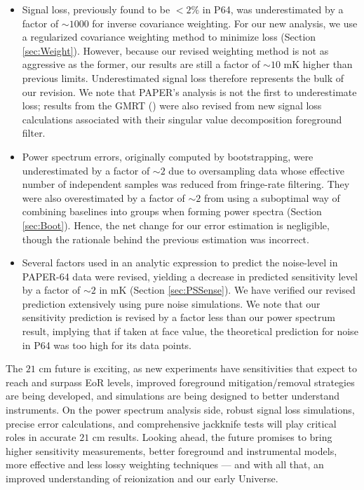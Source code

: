 \documentclass[preprint2,numberedappendix,tighten]{aastex6}  %
\begin{document}
\begin{itemize}
\item Signal loss, previously found to be $<2\%$ in P64, was underestimated by a factor of $\sim$$1000$ for inverse 
covariance weighting. For our new analysis, we use a regularized covariance weighting method to minimize loss (Section 
\ref{sec:Weight}). However, because our revised weighting method is not as aggressive as the former, our results are still a 
factor of $\sim10$ mK higher than previous limits. Underestimated signal loss therefore represents the bulk of our revision. We 
note that PAPER's analysis is not the first to underestimate loss; results from the GMRT (\citealt{paciga_et_al2013}) were also 
revised from new signal loss calculations associated with their singular value decomposition foreground filter.
\item Power spectrum errors, originally computed by bootstrapping, were underestimated by a factor of $\sim$$2$ due to 
oversampling data whose effective number of independent samples was reduced from fringe-rate filtering. They were also 
overestimated by a factor of $\sim$$2$ from using a suboptimal way of combining baselines into groups when forming power 
spectra (Section \ref{sec:Boot}). Hence, the net change for our error estimation is negligible, though the rationale behind the 
previous estimation was incorrect.
\item Several factors used in an analytic expression to predict the noise-level in PAPER-64 data were revised, yielding a 
decrease in predicted sensitivity level by a factor of $\sim$$2$ in mK (Section \ref{sec:PSSense}). We have verified our revised 
prediction extensively using pure noise simulations. We note that our sensitivity prediction is revised by a factor less than our 
power spectrum result, implying that if taken at face value, the theoretical prediction for noise in P64 was too high for its data 
points.
\end{itemize}

The $21$ cm future is exciting, as new experiments have sensitivities that expect to reach and surpass EoR levels, improved 
foreground mitigation/removal strategies are being developed, and simulations are being designed to better understand 
instruments. On the power spectrum analysis side, robust signal loss simulations, precise error calculations, and 
comprehensive jackknife tests will play critical roles in accurate $21$ cm results. Looking ahead, the future promises to bring 
higher sensitivity measurements, better foreground and instrumental models, more effective and less lossy weighting 
techniques --- and with all that, an improved understanding of reionization and our early Universe.
\end{document}
